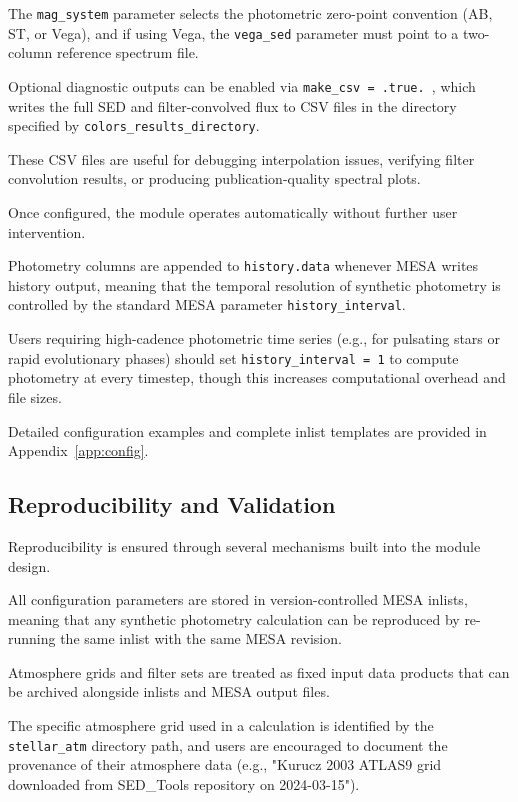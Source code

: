 \documentclass[linenumbers,apj,twocolumn, floatfix]{aastex701}
\begin{document}
The \texttt{mag\_system} parameter selects the photometric zero-point convention (AB, ST, or Vega), and if using Vega, the \texttt{vega\_sed} parameter must point to a two-column reference spectrum file.

Optional diagnostic outputs can be enabled via \texttt{make\_csv = .true.
}, which writes the full SED and filter-convolved flux to CSV files in the directory specified by \texttt{colors\_results\_directory}.

These CSV files are useful for debugging interpolation issues, verifying filter convolution results, or producing publication-quality spectral plots.

Once configured, the module operates automatically without further user intervention.

Photometry columns are appended to \texttt{history.data} whenever MESA writes history output, meaning that the temporal resolution of synthetic photometry is controlled by the standard MESA parameter \texttt{history\_interval}.

Users requiring high-cadence photometric time series (e.g., for pulsating stars or rapid evolutionary phases) should set \texttt{history\_interval = 1} to compute photometry at every timestep, though this increases computational overhead and file sizes.

Detailed configuration examples and complete inlist templates are provided in Appendix~\ref{app:config}.

\subsection{Reproducibility and Validation}
\label{sec:reproducibility}

Reproducibility is ensured through several mechanisms built into the module design.

All configuration parameters are stored in version-controlled MESA inlists, meaning that any synthetic photometry calculation can be reproduced by re-running the same inlist with the same MESA revision.

Atmosphere grids and filter sets are treated as fixed input data products that can be archived alongside inlists and MESA output files.

The specific atmosphere grid used in a calculation is identified by the \texttt{stellar\_atm} directory path, and users are encouraged to document the provenance of their atmosphere data (e.g., "Kurucz 2003 ATLAS9 grid downloaded from SED\_Tools repository on 2024-03-15").
\end{document}
